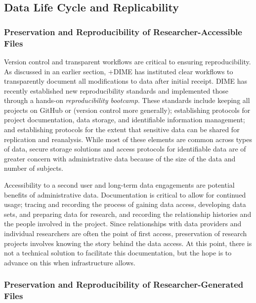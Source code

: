 \documentclass[
]{WileySix}
\begin{document}
\hypertarget{data-life-cycle-and-replicability-5}{%
\subsection{Data Life Cycle and Replicability}\label{data-life-cycle-and-replicability-5}}

\hypertarget{preservation-and-reproducibility-of-researcher-accessible-files-6}{%
\subsubsection{Preservation and Reproducibility of Researcher-Accessible Files}\label{preservation-and-reproducibility-of-researcher-accessible-files-6}}

Version control and transparent workflows are critical to ensuring reproducibility. As discussed in an earlier section, +DIME\textbar{} has instituted clear workflows to transparently document all modifications to data after initial receipt. DIME has recently established new reproducibility standards and implemented those through a hands-on \emph{reproducibility bootcamp}. These standards include keeping all projects on GitHub or (version control more generally); establishing protocols for project documentation, data storage, and identifiable information management; and establishing protocols for the extent that sensitive data can be shared for replication and reanalysis. While most of these elements are common across types of data, secure storage solutions and access protocols for identifiable data are of greater concern with administrative data because of the size of the data and number of subjects.

Accessibility to a second user and long-term data engagements are potential benefits of administrative data. Documentation is critical to allow for continued usage; tracing and recording the process of gaining data access, developing data sets, and preparing data for research, and recording the relationship histories and the people involved in the project. Since relationships with data providers and individual researchers are often the point of first access, preservation of research projects involves knowing the story behind the data access. At this point, there is not a technical solution to facilitate this documentation, but the hope is to advance on this when infrastructure allows.

\hypertarget{preservation-and-reproducibility-of-researcher-generated-files-5}{%
\subsubsection{Preservation and Reproducibility of Researcher-Generated Files}\label{preservation-and-reproducibility-of-researcher-generated-files-5}}
\end{document}
